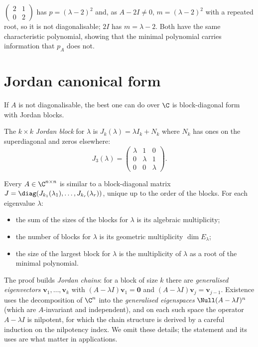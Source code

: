 \begin{example}
$\begin{pmatrix}2&1\\0&2\end{pmatrix}$ has $p=(\lambda-2)^2$ and, as $A-2I\ne0$, $m=(\lambda-2)^2$ with a repeated root, so it is not diagonalisable; $2I$ has $m=\lambda-2$. Both have the same characteristic polynomial, showing that the minimal polynomial carries information that $p_A$ does not.
\end{example}

\section{Jordan canonical form}

If $A$ is not diagonalisable, the best one can do over $\C$ is block-diagonal form with Jordan blocks.

\begin{definition}
The $k\times k$ \emph{Jordan block} for $\lambda$ is $J_k(\lambda)=\lambda I_k+N_k$ where $N_k$ has ones on the superdiagonal and zeros elsewhere:
\[ J_3(\lambda)=\begin{pmatrix}\lambda&1&0\\0&\lambda&1\\0&0&\lambda\end{pmatrix}. \]
\end{definition}

\begin{theorem}\label{thm:jordan}
Every $A\in\C^{n\times n}$ is similar to a block-diagonal matrix $J=\diag(J_{k_1}(\lambda_1),\dots,J_{k_r}(\lambda_r))$, unique up to the order of the blocks. For each eigenvalue $\lambda$:
\begin{itemize}
  \item the sum of the sizes of the blocks for $\lambda$ is its algebraic multiplicity;
  \item the number of blocks for $\lambda$ is its geometric multiplicity $\dim E_\lambda$;
  \item the size of the largest block for $\lambda$ is the multiplicity of $\lambda$ as a root of the minimal polynomial.
\end{itemize}
\end{theorem}

The proof builds \emph{Jordan chains}: for a block of size $k$ there are \emph{generalised eigenvectors} $\mathbf{v}_1,\dots,\mathbf{v}_k$ with $(A-\lambda I)\mathbf{v}_1=\mathbf{0}$ and $(A-\lambda I)\mathbf{v}_{j}=\mathbf{v}_{j-1}$. Existence uses the decomposition of $\C^n$ into the \emph{generalised eigenspaces} $\Null(A-\lambda I)^{n}$ (which are $A$-invariant and independent), and on each such space the operator $A-\lambda I$ is nilpotent, for which the chain structure is derived by a careful induction on the nilpotency index. We omit these details; the statement and its uses are what matter in applications.

